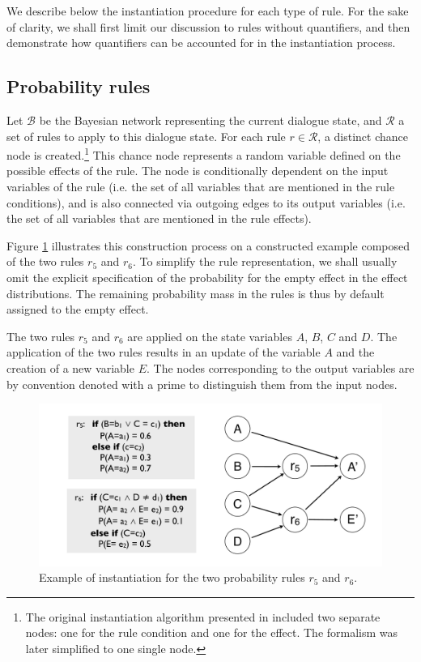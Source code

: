 We describe below the instantiation procedure for each type of rule. For the sake of clarity, we shall first limit our discussion to rules without quantifiers, and then demonstrate how quantifiers can be accounted for in the instantiation process. 

\subsection{Probability rules}
\label{sec:probruleinstantiation}

Let $\mathcal{B}$ be the Bayesian network representing the current dialogue state, and $\mathcal{R}$ a set of rules to apply to this dialogue state.  For each rule $r \in \mathcal{R}$, a distinct chance node is created.\footnote{The original instantiation algorithm presented in \citep{rulebasedmodels-sigdial2012} included two separate nodes: one for the rule condition and one for the effect.  The formalism was later simplified to one single node.} This chance node represents a random variable defined on the possible effects of the rule.  The node is conditionally dependent on the input variables of the rule (i.e. the set of all variables that are mentioned in the rule conditions), and is also connected via outgoing edges to its output variables (i.e. the set of all variables that are mentioned in the rule effects). 

Figure \ref{fig:instantiationprob} illustrates this construction process on a constructed example composed of the two rules $r_5$ and $r_6$.  To simplify the rule representation, we shall usually omit the explicit specification of the probability for the empty effect in the effect distributions.  The remaining probability mass in the rules is thus by default assigned to the empty effect.

The two rules $r_5$ and $r_6$ are applied on the state variables $A$, $B$, $C$ and $D$.  The application of the two rules results in an update of the variable $A$ and the creation of a new variable $E$. The nodes corresponding to the output variables are by convention denoted with a prime to distinguish them from the input nodes.  

\begin{figure}[h]
\centering
\includegraphics[scale=0.25]{imgs/ruleinstantiation.pdf}
\caption{Example of instantiation for the two probability rules $r_5$ and $r_6$. }
\label{fig:instantiationprob}
\end{figure}

